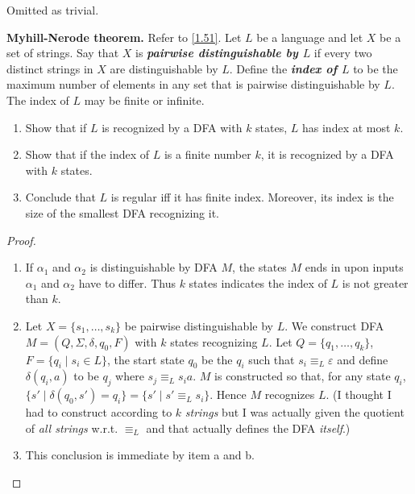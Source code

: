 Omitted as trivial.

\begin{exercise}{1.52}
  \textbf{Myhill-Nerode theorem.} Refer to \ref{1.51}. Let $L$ be a language and let $X$ be a set of strings. Say that $X$ is \textbf{\textit{pairwise distinguishable by $L$}} if every two distinct strings in $X$ are distinguishable by $L$. Define the \textbf{\textit{index of $L$}} to be the maximum number of elements in any set that is pairwise distinguishable by $L$. The index of $L$ may be finite or infinite.

  \begin{enumerate}[label=\textbf{\alph*.}]
    \item Show that if $L$ is recognized by a DFA with $k$ states, $L$ has index at most $k$.
    \item Show that if the index of $L$ is a finite number $k$, it is recognized by a DFA with $k$ states.
    \item Conclude that $L$ is regular iff it has finite index. Moreover, its index is the size of the smallest DFA recognizing it.\qedhere
  \end{enumerate}
\end{exercise}

\begin{proof}
  \begin{enumerate}[label=\textbf{\alph*.}]
    \item If $\alpha_1$ and $\alpha_2$ is distinguishable by DFA $M$, the states $M$ ends in upon inputs $\alpha_1$ and $\alpha_2$ have to differ. Thus $k$ states indicates the index of $L$ is not greater than $k$.
    \item Let $X = \{s_1, \dots, s_k\}$ be pairwise distinguishable by $L$. We construct DFA $M = (Q, \Sigma, \delta, q_0, F)$ with $k$ states recognizing $L$. Let $Q = \{q_1, \dots, q_k\}$, $F = \{q_i \mid s_i \in L\}$, the start state $q_0$ be the $q_i$ such that $s_i \equiv_L \varepsilon$ and define $\delta(q_i,a)$ to be $q_j$ where $s_j\equiv_L s_ia$. $M$ is constructed so that, for any state $q_i$, $\{s' \mid \delta(q_0, s') = q_i\} = \{s' \mid s' \equiv_L s_i\}$. Hence $M$ recognizes $L$. (I thought I had to construct according to $k$ \textit{strings} but I was actually given the quotient of \textit{all strings} w.r.t. $\equiv_L$ and that actually defines the DFA \textit{itself}.)
    \item This conclusion is immediate by item a and b.\qedhere
  \end{enumerate}
\end{proof}

